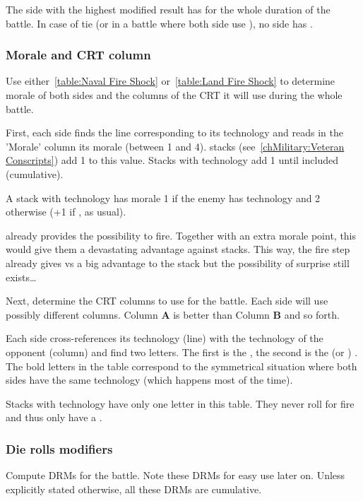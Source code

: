 The side with the highest modified result has  for the
whole duration of the battle. In case of tie (or in a battle where both side
use \NGD), no side has .

\subsubsection{Morale and CRT column}
\label{chMilitary:Battle:Parameters:CRT}
Use either~\ref{table:Naval Fire Shock} or~\ref{table:Land Fire Shock} to
determine morale of both sides and the columns of the CRT it will use during
the whole battle.



First, each side finds the line corresponding to its technology and reads in
the 'Morale' column its morale (between 1 and 4).  stacks
(see~\ref{chMilitary:Veteran Conscripts}) add 1 to this value. Stacks with
\TTER technology add 1 until \TARQ included (cumulative).

A stack with \TREN technology has morale 1 if the enemy has \TMED technology
and 2 otherwise (+1 if , as usual).

\begin{designnote}
  \TREN already provides the possibility to fire. Together with an extra
  morale point, this would give them a devastating advantage against \TMED
  stacks. This way, the fire step already gives \TREN vs \TMED a big advantage
  to the \TREN stack but the possibility of surprise still exists\ldots
\end{designnote}

Next, determine the CRT columns to use for the battle. Each side will use
possibly different columns. Column \textbf{A} is better than Column \textbf{B}
and so forth.

Each side cross-references its technology (line) with the technology of the
opponent (column) and find two letters. The first is the , the second is the  (or ) . The bold letters in the table correspond to the symmetrical
situation where both sides have the same technology (which happens most of the
time).

Stacks with \TMED technology have only one letter in this table. They never
roll for fire and thus only have a .

\subsubsection{Die rolls modifiers}
\label{chMilitary:Battle:Parameters:DRM}
Compute DRMs for the battle. Note these DRMs for easy use later on. Unless
explicitly stated otherwise, all these DRMs are cumulative.

